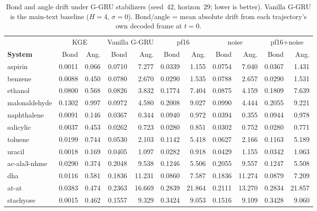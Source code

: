 \documentclass{article}
\newcommand{\GKE}{\textsc{KGE}}
\newcommand{\GGRU}{\textsc{G-GRU}}
\begin{document}
\begin{table}[H]
\centering
\caption{Bond and angle drift under \GGRU{} stabilizers (seed~$42$, horizon~$29$; lower is better). Vanilla \GGRU{} is the main-text baseline ($H{=}4$, $\sigma{=}0$). Bond/angle = mean absolute drift from each trajectory's own decoded frame at $t=0$.}
\label{tab:gru_stab_bond_angle}
{\footnotesize
\setlength{\tabcolsep}{3.2pt}
\begin{tabular}{l rr rr rr rr rr}
\toprule
 & \multicolumn{2}{c}{\GKE{}} & \multicolumn{2}{c}{Vanilla \GGRU{}} & \multicolumn{2}{c}{pf16} & \multicolumn{2}{c}{noise} & \multicolumn{2}{c}{pf16+noise} \\
\cmidrule(lr){2-3}\cmidrule(lr){4-5}\cmidrule(lr){6-7}\cmidrule(lr){8-9}\cmidrule(lr){10-11}
\textbf{System} & Bond & Ang. & Bond & Ang. & Bond & Ang. & Bond & Ang. & Bond & Ang. \\
\midrule
aspirin & 0.0011 & 0.066 & 0.0710 & 7.277 & 0.0339 & 1.155 & 0.0754 & 7.040 & 0.0367 & 1.431 \\
benzene & 0.0088 & 0.450 & 0.0780 & 2.670 & 0.0290 & 1.535 & 0.0788 & 2.657 & 0.0290 & 1.531 \\
ethanol & 0.0800 & 0.568 & 0.0826 & 3.832 & 0.1774 & 7.404 & 0.0875 & 4.159 & 0.1809 & 7.639 \\
malonaldehyde & 0.1302 & 0.997 & 0.0972 & 4.580 & 0.2008 & 9.027 & 0.0990 & 4.444 & 0.2055 & 9.221 \\
naphthalene & 0.0091 & 0.146 & 0.0367 & 0.344 & 0.0940 & 0.972 & 0.0394 & 0.355 & 0.0944 & 0.978 \\
salicylic & 0.0037 & 0.453 & 0.0262 & 0.723 & 0.0280 & 0.851 & 0.0302 & 0.752 & 0.0280 & 0.771 \\
toluene & 0.0199 & 0.744 & 0.0530 & 2.103 & 0.1142 & 5.418 & 0.0627 & 2.166 & 0.1163 & 5.189 \\
uracil & 0.0018 & 0.169 & 0.0405 & 1.097 & 0.0282 & 0.918 & 0.0429 & 1.155 & 0.0342 & 1.063 \\
ac-ala3-nhme & 0.0290 & 0.374 & 0.2048 & 9.538 & 0.1246 & 5.506 & 0.2055 & 9.557 & 0.1247 & 5.508 \\
dha & 0.0116 & 0.581 & 0.1836 & 11.231 & 0.0860 & 7.587 & 0.1836 & 11.274 & 0.0879 & 7.209 \\
at-at & 0.0383 & 0.474 & 0.2363 & 16.669 & 0.2839 & 21.864 & 0.2111 & 13.270 & 0.2834 & 21.857 \\
stachyose & 0.0015 & 0.462 & 0.1557 & 9.329 & 0.3424 & 9.053 & 0.1516 & 9.109 & 0.3428 & 9.060 \\
\bottomrule
\end{tabular}}
\end{table}
\end{document}
